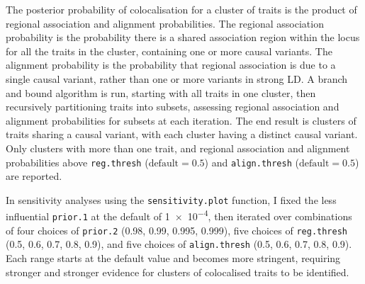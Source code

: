 The posterior probability of colocalisation for a cluster of traits is the product of regional association and alignment probabilities.
The regional association probability is the probability there is a shared association region within the locus for all the traits in the cluster, containing one or more causal variants.
The alignment probability is the probability that regional association is due to a single causal variant, rather than one or more variants in strong \gls{LD}. 
A branch and bound algorithm is run, starting with all traits in one cluster,
then recursively partitioning traits into subsets, assessing regional association and alignment probabilities for subsets at each iteration.
The end result is clusters of traits sharing a causal variant, with each cluster having a distinct causal variant.
Only clusters with more than one trait, and regional association and alignment probabilities above \texttt{reg.thresh} ($\text{default}=0.5$) and \texttt{align.thresh} ($\text{default}=0.5$) are reported.

In sensitivity analyses using the \texttt{sensitivity.plot} function,
I fixed the less influential \texttt{prior.1} at the default of \num{1e-4}, 
then iterated over combinations of
four choices of \texttt{prior.2} (0.98, 0.99, 0.995, 0.999),
five choices of \texttt{reg.thresh} (0.5, 0.6, 0.7, 0.8, 0.9),
and five choices of \texttt{align.thresh} (0.5, 0.6, 0.7, 0.8, 0.9).
Each range starts at the default value and becomes more stringent, 
requiring stronger and stronger evidence for clusters of colocalised traits to be identified.

